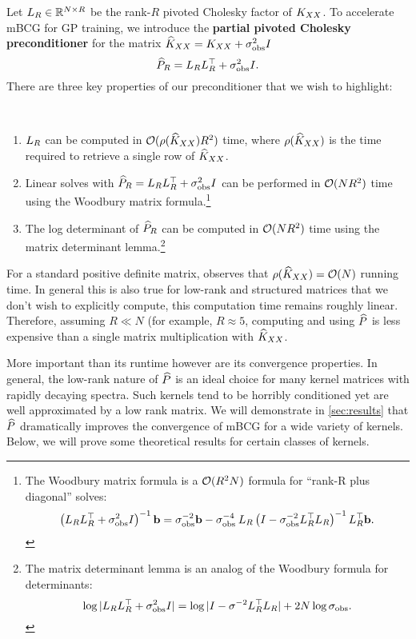 Let $L_{R} \in \mathbb{R}^{N \times R}$ be the rank-$R$ pivoted Cholesky factor of $K_{XX}$.
To accelerate mBCG for GP training, we introduce the {\bf partial pivoted Cholesky preconditioner} for the matrix $\widehat{K}_{XX} = K_{XX} + \sigma^2_\text{obs} I$
\begin{equation}
  \widehat{P}_R = L_{R} L_{R}^\top + \sigma^2_\text{obs} I.
\end{equation}
%
There are three key properties of our preconditioner that we wish to highlight:
%
\begin{observation}
  {\ }
  \begin{enumerate}
    \item $L_{R}$ can be computed in $\bigo{\row{\trainK}R^{2}}$ time, where $\rho ( \widehat{K}_{XX} )$ is the time required to retrieve a single row of $\widehat{K}_{XX}$.

    \item Linear solves with $\widehat{P}_R = L_{R} L_{R}^{\top} + \sigma_\text{obs}^{2} I$ can be performed in $\bigo{NR^{2}}$ time using the Woodbury matrix formula.\footnote{
      The Woodbury matrix formula is a $\bigo{R^2 N}$ formula for ``rank-R plus diagonal'' solves:
      $$\left( L_{R} L_{R}^{\top} + \sigma^{2}_\text{obs} I \right)^{-1} \mathbf{b} = {\sigma_\text{obs}^{-2}}\mathbf{b} - {\sigma_\text{obs}^{-4}} \: L_{R} \left( I - {\sigma^{-2}_\text{obs}} L_{R}^{\top} L_{R} \right)^{-1} L_{R}^{\top}\mathbf{b}.$$
    }

    \item The log determinant of $\widehat{P}_R$ can be computed in $\bigo{NR^{2}}$ time using the matrix determinant lemma.\footnote{
      The matrix determinant lemma is an analog of the Woodbury formula for determinants:
      $$\log \vert L_{R} L_{R}^\top + \sigma^{2}_\text{obs} I \vert = \log \vert I - {\sigma^{-2}} L_{R}^{\top} L_{R} \vert + 2 N \log \sigma_\text{obs}.$$
    }
  \end{enumerate}
\end{observation}
For a standard positive definite matrix, \citet{harbrecht2012low} observes that $\row{\trainK} = \bigo{N}$ running time.
In general this is also true for low-rank and structured matrices that we don't wish to explicitly compute, this computation time remains roughly linear.
Therefore, assuming $R \ll N$ (for example, $R \approx 5$, computing and using $\widehat{P}$ is less expensive than a single matrix multiplication with $\widehat{K}_{XX}$.

More important than its runtime however are its convergence properties.
In general, the low-rank nature of $\widehat{P}$ is an ideal choice for many kernel matrices with rapidly decaying spectra.
Such kernels tend to be horribly conditioned yet are well approximated by a low rank matrix.
We will demonstrate in \cref{sec:results} that $\widehat{P}$ dramatically improves the convergence of mBCG for a wide variety of kernels.
Below, we will prove some theoretical results for certain classes of kernels.

